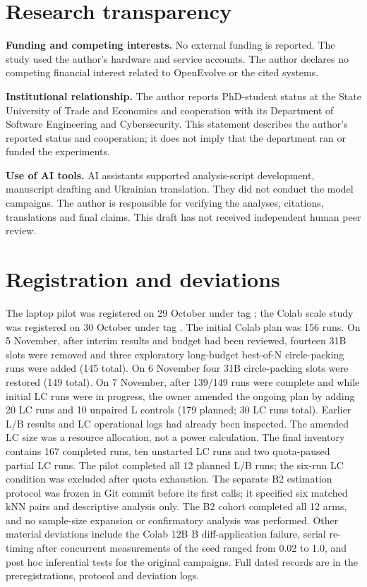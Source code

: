 \documentclass[11pt]{article}
\begin{document}
\section*{Research transparency}
\textbf{Funding and competing interests.} No external funding is reported. The study used the author's hardware and service accounts. The author declares no competing financial interest related to OpenEvolve or the cited systems.

\textbf{Institutional relationship.} The author reports PhD-student status at the State University of Trade and Economics and cooperation with its Department of Software Engineering and Cybersecurity. This statement describes the author's reported status and cooperation; it does not imply that the department ran or funded the experiments.

\textbf{Use of AI tools.} AI assistants supported analysis-script development, manuscript drafting and Ukrainian translation. They did not conduct the model campaigns. The author is responsible for verifying the analyses, citations, translations and final claims. This draft has not received independent human peer review.




\clearpage
\appendix
\section{Registration and deviations}\label{app:registration}

The laptop pilot was registered on 29 October under tag ; the Colab scale study was registered on 30 October under tag . The initial Colab plan was 156 runs. On 5 November, after interim results and budget had been reviewed, fourteen 31B slots were removed and three exploratory long-budget best-of-N circle-packing runs were added (145 total). On 6 November four 31B circle-packing slots were restored (149 total). On 7 November, after 139/149 runs were complete and while initial LC runs were in progress, the owner amended the ongoing plan by adding 20 LC runs and 10 unpaired L controls (179 planned; 30 LC runs total). Earlier L/B results and LC operational logs had already been inspected. The amended LC size was a resource allocation, not a power calculation. The final inventory contains 167 completed runs, ten unstarted LC runs and two quota-paused partial LC runs. The pilot completed all 12 planned L/B runs; the six-run LC condition was excluded after quota exhaustion. The separate B2 estimation protocol was frozen in Git commit  before its first calls; it specified six matched kNN pairs and descriptive analysis only. The B2 cohort completed all 12 arms, and no sample-size expansion or confirmatory analysis was performed. Other material deviations include the Colab 12B B diff-application failure, serial re-timing after concurrent measurements of the seed ranged from 0.02 to 1.0, and post hoc inferential tests for the original campaigns. Full dated records are in the preregistrations, protocol and deviation logs.
\end{document}
